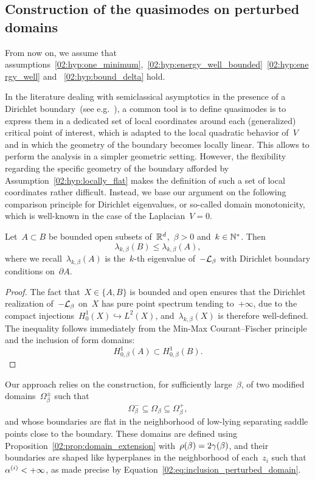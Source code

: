         \subsection{Construction of the quasimodes on perturbed domains}
        \label{02:subsec:ek_quasimodes}
        From now on, we assume that assumptions~\eqref{02:hyp:one_minimum},~\eqref{02:hyp:energy_well_bounded}~\eqref{02:hyp:energy_well} and ~\eqref{02:hyp:bound_delta} hold.

        In the literature dealing with semiclassical asymptotics in the presence of a Dirichlet boundary~(see e.g.~\cite{HN06,LPN21}), a common tool is to define quasimodes is to express them in a dedicated set of local coordinates around each (generalized) critical point of interest, which is adapted to the local quadratic behavior of~$V$ and in which the geometry of the boundary becomes locally linear. This allows to perform the analysis in a simpler geometric setting.
        However, the flexibility regarding the specific geometry of the boundary afforded by Assumption~\eqref{02:hyp:locally_flat} makes the definition of such a set of local coordinates rather difficult. Instead, we base our argument on the following comparison principle for Dirichlet eigenvalues, or so-called domain monotonicity, which is well-known in the case of the Laplacian~$V=0$. 
        \begin{proposition}
        \label{02:prop:comparison_principle}
        Let~$A \subset B$ be bounded open subsets of~$\mathbb{R}^d$,~$\beta>0$ and~$k\in\mathbb{N}^*$.
        Then
        \[\lambda_{k,\beta}(B)\leq\lambda_{k,\beta}(A),\]
        where we recall~$\lambda_{k,\beta}(A)$ is the~$k$-th eigenvalue of~$-\mathcal{L}_\beta$ with Dirichlet boundary conditions on~$\partial A$.
    \end{proposition}
    \begin{proof}
        The fact that~$X\in\{A,B\}$ is bounded and open ensures that the Dirichlet realization of~$-\mathcal{L}_\beta$ on~$X$ has pure point spectrum tending to~$+\infty$, due to the compact injections~$H_0^1(X)\hookrightarrow L^2(X)$, and~$\lambda_{k,\beta}(X)$ is therefore well-defined.
        The inequality follows immediately from the Min-Max Courant--Fischer principle and the inclusion of form domains:
        \[H_{0,\beta}^1(A)\subset H_{0,\beta}^1(B).\]        
    \end{proof}
    
    Our approach relies on the construction, for sufficiently large~$\beta$, of two modified domains~$\Omega_\beta^{\pm}$ such that
    \begin{equation}
        \label{02:eq:domain_sandwich}
        \Omega_\beta^- \subseteq \Omega_\beta \subseteq \Omega_\beta^+,
    \end{equation}
    and whose boundaries are flat in the neighborhood of low-lying separating saddle points close to the boundary. These domains are defined using Proposition~\ref{02:prop:domain_extension} with~$\rho(\beta)=2\gamma(\beta)$, and their boundaries are shaped like hyperplanes in the neighborhood of each~$z_i$ such that~$\alpha^{(i)}<+\infty$, as made precise by Equation~\eqref{02:eq:inclusion_perturbed_domain}.

